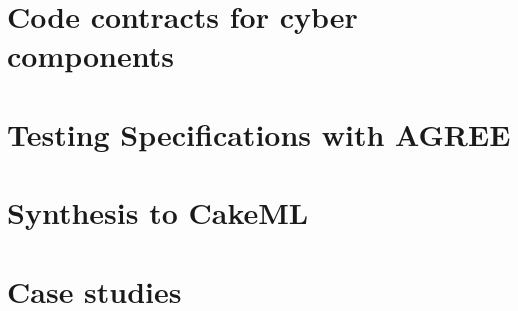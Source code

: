 \documentclass[global,twocolumn,keeplastbox]{svjour}
\newif\ifREVISIONS
\begin{document}
\section{Code contracts for cyber components}
\label{sec:code-contracts}


\ifREVISIONS
\subsection{Revisions}
\begin{compactitem}
  \item \sout{Add in intuitive definition or AGREE leaf-component semantics}
  \item State well-formed theorem
  \item State correctness theorem or any key theorems to the synthesis proof
\end{compactitem}
\fi

\section{Testing Specifications with AGREE}
\label{sec:testing}





\section{Synthesis to CakeML}
\label{sec:synthesis}


\ifREVISIONS
\subsection{Revisions}
\begin{compactitem}
  \item State theorem relating the step function to the meaning of the leaf-node semantics
\end{compactitem}
\fi

\section{Case studies}
\label{sec:case-study}

\end{document}
